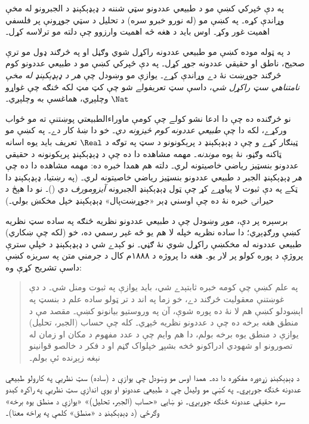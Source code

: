 \documentclass[../../../include/open-logic-section]{subfiles}
\begin{document}


په دې څپرکي کښې مو د طبيعي عددونو سټي شننه د ډېډېکېنډ د الجبرونو
له مخې وړاندې کړه۔ په  کښې مو (له نورو
خبرو سره) د تحليل د سټي جوړونې پر فلسفي اهميت غور وکړ۔ اوس بايد د
هغه څه اهميت وارزوو چې دلته مو ترلاسه کړل۔

د  په ټوله موده کښې مو طبيعي عددونه
راکړل شوي وګڼل او په څرګند ډول مو ترې صحيح، ناطق او حقيقي عددونه
جوړ کړل۔ په دې څپرکي کښې مو د طبيعي عددونو کوم څرګند جوړښت نۀ دے
وړاندې کړے۔ يوازې مو وښودل چې \emph{هر د ډېډېکېنډ له مخې نامتناهي
سټ راکړل شي}، داسې سټ تعريفولے شو چې کټ مټ لکه څنګه چې غواړو
$\Nat$ وچلېږي، هماغسې به وچلېږي۔

نو څرګنده ده چې دا ادعا نشو کولے چې کومې ماوراءالطبيعتي پوښتنې ته
مو ځواب ورکړے، لکه دا چې \emph{طبيعي عددونه کوم څيزونه دي}۔ خو دا
ښۀ کار دے۔ په  کښې مو ټينګار کړے و چې
د ډېډېکېنډ د پرېکونونو د سټ په توګه د $\Real$ تعريف بايد يوه اسانه
ټاکنه وګڼو، نۀ يوه \emph{موندنه}۔ مهمه مشاهده دا ده چې د
ډېډېکېنډ پرېکونونه د حقيقي عددونو بنسټيز رياضي خاصيتونه لري۔ دلته
هم همدا خبره ده: مهمه مشاهده دا ده چې \emph{هر} ډېډېکېنډ الجبر د
طبيعي عددونو بنسټيز رياضي خاصيتونه لري۔ (په رښتيا، ډېډېکېنډ دا
ټکے په دې ثبوت لا پياوړے کړ چې ټول ډېډېکېنډ الجبرونه
\emph{آيزومورف} دي (\citeyear[Theorems
132--3]{Dedekind1888})۔ نو
دا هېڅ د حيرانۍ خبره نۀ ده چې اوسني ډېر «جوړښت‌پال» ډېډېکېنډ خپل
مخکښ بولي۔)

برسېره پر دې، موږ وښودل چې د طبيعي عددونو نظريه څنګه په ساده سټ
نظريه کښې ورګډېږي؛ دا ساده نظريه خپله لا هم يو څه غېر رسمي ده، خو
(لکه چې ښکاري) طبيعي عددونه له مخکښې راکړل شوي نۀ ګڼي۔ نو کېدے شي
د ډېډېکېنډ د خپلې سترې پروژې د پوره کولو پر لار يو۔ هغه دا پروژه
د ۱۸۸۸م کال د جرمني متن په سريزه کښې داسې تشريح کړې وه:
\begin{quote}
  په علم کښې چې کومه خبره ثابتېدے شي، بايد يوازې په ثبوت ومنل
  شي۔ د دې غوښتنې معقوليت څرګند دے، خو زما په اند د تر ټولو ساده علم
  د بنسټ په اېښودلو کښې هم لا نۀ ده پوره شوې، آن په وروستيو
  بيانونو کښې۔ مقصد مې د منطق هغه برخه ده چې د عددونو نظريه
  څېړي۔ کله چې حساب (الجبر، تحليل) يوازې د منطق يوه برخه بولم، دا هم
  وايم چې د عدد مفهوم د مکان او زمان له تصورونو او شهودي ادراکونو
  څخه بشپړ خپلواک ګڼم او د فکر د خالصو قوانينو نېغه زېږنده ئې بولم۔
  \citep[preface]{Dedekind1888}
\end{quote}
د ډېډېکېنډ زړه‌وره مفکوره دا ده۔ همدا اوس مو وښودل چې يوازې د
(ساده) سټ نظريې په کارولو طبيعي عددونه څنګه جوړېږي۔ په
 کښې مو وليدل چې د طبيعي عددونو او يوې
اندازې سټ نظريې په راکړه کېدو سره حقيقي عددونه څنګه جوړېږي۔ نو
ښايي «حساب (الجبر، تحليل)» «يوازې د منطق يوه برخه» وګرځي (د
ډېډېکېنډ د «منطق» کلمې په پراخه معنا)۔
\end{document}
